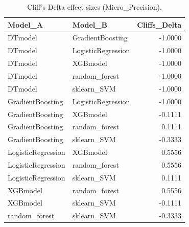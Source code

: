 \begin{table}[t]
\centering
\begin{tabular}{llr}
\toprule
Model_A & Model_B & Cliffs_Delta \\
\midrule
DTmodel & GradientBoosting & -1.0000 \\
DTmodel & LogisticRegression & -1.0000 \\
DTmodel & XGBmodel & -1.0000 \\
DTmodel & random_forest & -1.0000 \\
DTmodel & sklearn_SVM & -1.0000 \\
GradientBoosting & LogisticRegression & -1.0000 \\
GradientBoosting & XGBmodel & -0.1111 \\
GradientBoosting & random_forest & 0.1111 \\
GradientBoosting & sklearn_SVM & -0.3333 \\
LogisticRegression & XGBmodel & 0.5556 \\
LogisticRegression & random_forest & 0.5556 \\
LogisticRegression & sklearn_SVM & 0.1111 \\
XGBmodel & random_forest & 0.5556 \\
XGBmodel & sklearn_SVM & -0.1111 \\
random_forest & sklearn_SVM & -0.3333 \\
\bottomrule
\end{tabular}
\caption{Cliff's Delta effect sizes (Micro_Precision).}
\label{tab:cliffs_Micro_Precision}
\end{table}